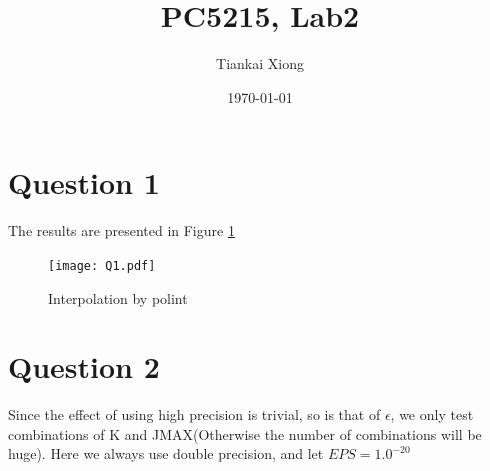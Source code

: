 \documentclass{article}
\author{Tiankai Xiong}
\date{\today}
\title{PC5215, Lab2}
\begin{document}
\maketitle

\section{Question 1}
\label{sec-1}

The results are presented in Figure \ref{fig:Q1}

\begin{figure}[H]
  \centering
  \texttt{[image: Q1.pdf]}
  \caption{Interpolation by polint}
  \label{fig:Q1}
\end{figure}

\section{Question 2}
\label{sec-2}

Since the effect of using high precision is trivial, so is that of
$\epsilon$, we only test combinations of K and JMAX(Otherwise the
number of combinations will be huge). Here we always use double
precision, and let $EPS = 1.0^{-20}$
\end{document}
